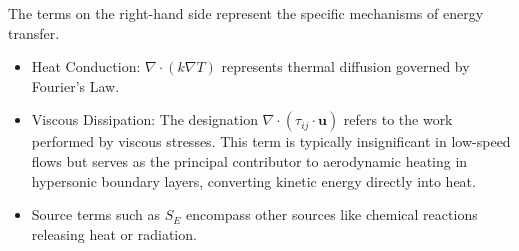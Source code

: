The terms on the right-hand side represent the specific mechanisms of energy transfer.
\begin{itemize}
    \item Heat Conduction: $\nabla \cdot (k \nabla T)$ represents thermal diffusion governed by Fourier's Law.

    \item Viscous Dissipation: The designation $\nabla \cdot (\tau_{ij} \cdot \mathbf{u})$ refers to the work performed by viscous stresses. This term is typically insignificant in low-speed flows but serves as the principal contributor to aerodynamic heating in hypersonic boundary layers, converting kinetic energy directly into heat.

    \item Source terms such as $S_E$ encompass other sources like chemical reactions releasing heat or radiation.
\end{itemize}


